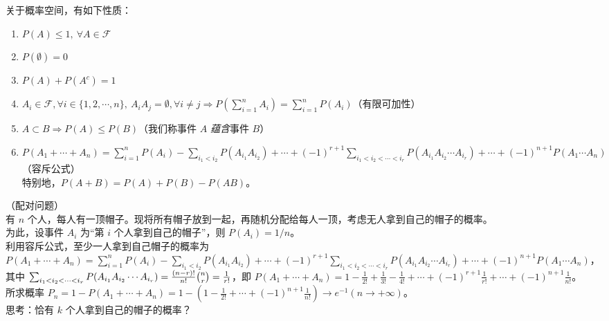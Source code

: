 \documentclass[../main.tex]{subfiles}
\begin{document}
\begin{proposition}
    关于概率空间，有如下性质：
    \begin{enumerate}
        \item $P(A)\leq 1,\ \forall A\in\mathcal{F}$
        \item $P(\emptyset)=0$
        \item $P(A)+P(A^c)=1$
        \item $A_i\in\mathcal{F},\forall i\in\{1,2,\cdots,n\},\ A_iA_j=\emptyset,\forall i\neq j\Rightarrow P(\sum_{i=1}^n A_i)=\sum_{i=1}^n P(A_i)$（有限可加性）
        \item $A\subset B\Rightarrow P(A)\leq P(B)$（我们称事件 $A$ \emph{蕴含}事件 $B$）
        \item $P(A_1+\cdots+A_n)=\sum_{i=1}^n P(A_i)-\sum_{i_1<i_2}P(A_{i_1}A_{i_2})+\cdots+(-1)^{r+1}\sum_{i_1<i_2<\cdots<i_r}P(A_{i_1}A_{i_2}\cdots A_{i_r})+\cdots+(-1)^{n+1}P(A_1\cdots A_n)$（容斥公式）
              \\特别地，$P(A+B)=P(A)+P(B)-P(AB)$。
    \end{enumerate}
\end{proposition}

\begin{example}
    （配对问题）\\
    有 $n$ 个人，每人有一顶帽子。现将所有帽子放到一起，再随机分配给每人一顶，考虑无人拿到自己的帽子的概率。\\
    为此，设事件 $A_i$ 为“第 $i$ 个人拿到自己的帽子”，则 $P(A_i)=1/n$。\\
    利用容斥公式，至少一人拿到自己帽子的概率为 $P(A_1+\cdots+A_n)=\sum_{i=1}^n P(A_i)-\sum_{i_1<i_2}P(A_{i_1}A_{i_2})+\cdots+(-1)^{r+1}\sum_{i_1<i_2<\cdots<i_r}P(A_{i_1}A_{i_2}\cdots A_{i_r})+\cdots+(-1)^{n+1}P(A_1\cdots A_n)$，\\
    其中 $\sum_{i_1<i_2<\cdots<i_r}P(A_{i_1}A_{i_2}\cdots A_{i_r})=\frac{(n-r)!}{n!}\tbinom{n}{r}=\frac{1}{r!}$，即 $P(A_1+\cdots+A_n)=1-\frac{1}{2!}+\frac{1}{3!}-\frac{1}{4!}+\cdots+(-1)^{r+1}\frac{1}{r!}+\cdots+(-1)^{n+1}\frac{1}{n!}$。\\
    所求概率 $P_n=1-P(A_1+\cdots+A_n)=1-(1-\frac{1}{2!}+\cdots+(-1)^{n+1}\frac{1}{n!})\rightarrow e^{-1}(n\rightarrow+\infty)$。\\
    思考：恰有 $k$ 个人拿到自己的帽子的概率？
\end{example}
\end{document}
